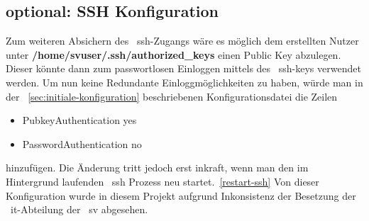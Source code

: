 \subsection{optional: SSH Konfiguration}\label{subsec:ssh-konfiguration}
Zum weiteren Absichern des ~\gls{ssh}-Zugangs wäre es möglich dem erstellten Nutzer unter \textbf{/home/svuser/.ssh/authorized\_keys} einen Public Key abzulegen.
Dieser könnte dann zum passwortlosen Einloggen mittels des ~\gls{ssh}-keys verwendet werden.
Um nun keine Redundante Einloggmöglichkeiten zu haben, würde man in der ~\ref{sec:initiale-konfiguration} beschriebenen Konfigurationsdatei die Zeilen
\begin{itemize}
    \item PubkeyAuthentication yes
    \item PasswordAuthentication no
\end{itemize}
hinzufügen.
Die Änderung tritt jedoch erst inkraft, wenn man den im Hintergrund laufenden ~\gls{ssh} Prozess neu startet.~\ref{restart-ssh}
Von dieser Konfiguration wurde in diesem Projekt aufgrund Inkonsistenz der Besetzung der ~\gls{it}-Abteilung der ~\gls{sv} abgesehen.
